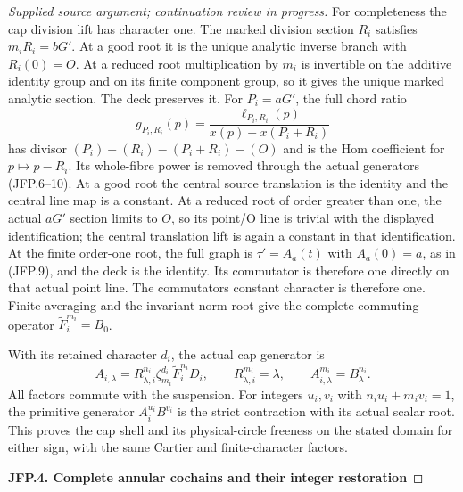 \begin{proof}[Supplied source argument; continuation review in progress]
For completeness the cap division lift has character one.
The marked division section \(R_i\) satisfies \(m_iR_i=bG'\).
At a good root it is the unique analytic inverse branch with
\(R_i(0)=O\). At a reduced root multiplication by \(m_i\)
is invertible on the additive identity group and on its finite
component group, so it gives the unique marked analytic section.
The deck preserves it. For \(P_i=aG'\), the full chord ratio
\[
 g_{P_i,R_i}(p)=
 \frac{\ell_{P_i,R_i}(p)}{x(p)-x(P_i+R_i)}
\tag{JFP.19}
\]
has divisor \((P_i)+(R_i)-(P_i+R_i)-(O)\) and is the Hom
coefficient for \(p\mapsto p-R_i\). Its whole-fibre power is
removed through the actual generators (JFP.6--10). At a good root
the central source translation is the identity and the central
line map is a constant. At a reduced root of order greater than one, the actual \(aG'\)
section limits to \(O\), so its point/O line is trivial with
the displayed identification; the central translation lift is
again a constant in that identification. At the finite order-one
root, the full graph is \(\tau'=A_a(t)\) with
\(A_a(0)=a\), as in (JFP.9), and the deck is the identity.
Its commutator is therefore one directly on that actual point line.
The commutator\textquotesingle s
constant character is therefore one. Finite averaging and the
invariant norm root give the complete commuting operator
\(\widetilde F_i^{m_i}=B_0\).

With its retained character \(d_i\), the actual cap generator is
\[
 A_{i,\lambda}=R_{\lambda,i}^{n_i}\zeta_{m_i}^{d_i}
 \widetilde F_i^{n_i}D_i,\qquad
 R_{\lambda,i}^{m_i}=\lambda,\qquad
 A_{i,\lambda}^{m_i}=B_\lambda^{n_i}.
\tag{JFP.20}
\]
All factors commute with the suspension. For integers \(u_i,v_i\)
with \(n_iu_i+m_iv_i=1\), the primitive generator
\(A_i^{u_i}B^{v_i}\) is the strict contraction with its actual
scalar root. This proves the cap shell and its physical-circle
freeness on the stated domain for either sign, with the same
Cartier and finite-character factors.

\par

\medskip\noindent\textbf{JFP.4. Complete annular cochains and their integer restoration}

\par\nobreak


\end{proof}
